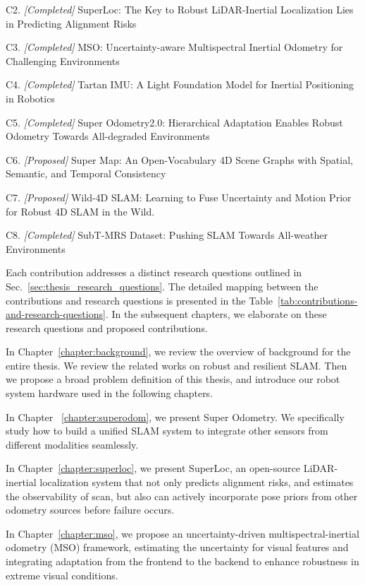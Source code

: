 C2. \textit{[Completed]} SuperLoc: The Key to Robust LiDAR-Inertial Localization Lies in Predicting Alignment Risks

C3. \textit{[Completed]} MSO: Uncertainty-aware Multispectral Inertial Odometry for Challenging Environments

C4. \textit{[Completed]} Tartan IMU: A Light Foundation Model for Inertial Positioning in Robotics

C5. \textit{[Completed]} Super Odometry2.0: Hierarchical Adaptation Enables Robust Odometry Towards All-degraded Environments

C6. \textit{[Proposed]}  Super Map: An Open-Vocabulary 4D Scene Graphs with Spatial, Semantic, and Temporal Consistency

C7. \textit{[Proposed]}  Wild-4D SLAM: Learning to Fuse Uncertainty and Motion Prior for Robust 4D SLAM in the Wild.


C8. \textit{[Completed]} SubT-MRS Dataset: Pushing SLAM Towards All-weather Environments




Each contribution addresses a distinct  research questions outlined in Sec.~\ref{sec:thesis_research_questions}. The detailed mapping between the contributions and research questions is presented in the Table~\ref{tab:contributions-and-research-questions}. In the subsequent chapters, we elaborate on these research questions and proposed contributions.

In Chapter~\ref{chapter:background}, we review the overview of background for the entire thesis. We review the related works on robust and resilient SLAM. Then we propose a broad problem definition of this thesis, and introduce our robot system hardware used in the following chapters. 

In Chapter ~\ref{chapter:superodom}, we present Super Odometry. We specifically study how to build a unified SLAM system to integrate other sensors from different modalities seamlessly.

In Chapter~\ref{chapter:superloc}, we present SuperLoc, an open-source LiDAR-inertial localization system that not only predicts alignment risks, and estimates
the observability of scan, but also can actively incorporate pose priors from other odometry sources before failure occurs. 

In Chapter~\ref{chapter:mso}, 
we propose an uncertainty-driven multispectral-inertial odometry (MSO) framework, estimating the uncertainty for visual features and integrating adaptation from the frontend to the backend to enhance robustness in extreme visual conditions.



